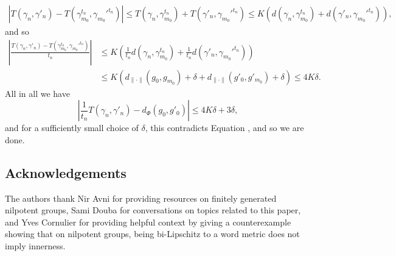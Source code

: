 \documentclass[12pt,reqno]{article}
\makeatletter
\let\reftagform@=\tagform@
\def\tagform@#1{\maketag@@@{(\ignorespaces\textcolor{purple}{#1}\unskip\@@italiccorr)}}
\renewcommand{\eqref}[1]{\textup{\reftagform@{\ref{#1}}}}
\numberwithin{equation}{section}
\makeatother
\begin{document}
\begin{align*}
   | T(\gamma_n, \gamma'_n) - T(\gamma_{m_0}^{t_n}, \gamma_{m_0}'^{t_n}) |
   \le T(\gamma_n, \gamma_{m_0}^{t_n}) + T(\gamma'_n, \gamma_{m_0}'^{t_n})
   \le K (d(\gamma_n, \gamma_{m_0}^{t_n}) + d(\gamma'_n, \gamma_{m_0}'^{t_n})),
\end{align*}
and so
\begin{align*}
   \left| \frac{T(\gamma_n, \gamma'_n) - T(\gamma_{m_0}^{t_n}, \gamma_{m_0}'^{t_n})}{t_n} \right|
   &\le K\left( \frac{1}{t_n}d(\gamma_n, \gamma_{m_0}^{t_n}) + \frac{1}{t_n}d(\gamma'_n, \gamma_{m_0}'^{t_n})\right) \\
   &\le K\left( d_{\|\cdot\|}(g_0,g_{m_0}) + \delta + d_{\|\cdot\|}(g'_0,g'_{m_0}) + \delta \right) \le 4K\delta.
\end{align*}
All in all we have
\[
   \left| \frac{1}{t_n} T(\gamma_n, \gamma'_n) - d_{\Phi}(g_0,g'_0) \right| \le 4K\delta + 3\delta,
\]
and for a sufficiently small choice of $\delta$, this contradicts Equation \eqref{eq:contradict}, and so we are done.

 \subsection*{Acknowledgements} 
 The authors thank Nir Avni for providing resources on finitely generated nilpotent groups, 
 Sami Douba for conversations on topics related to this paper,
 and Yves Cornulier for providing helpful context by giving a counterexample showing that on nilpotent groups, being
 bi-Lipschitz to a word metric does not imply innerness.
 



\end{document}
